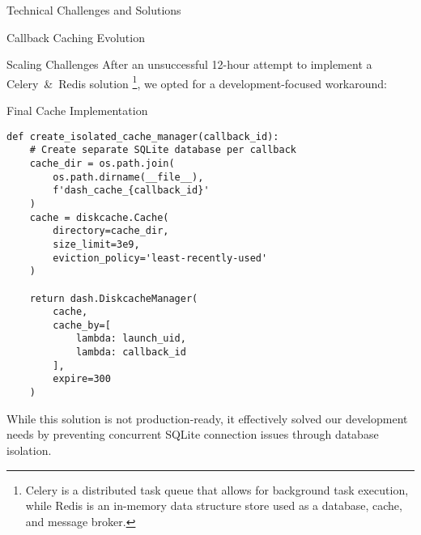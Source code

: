 \begin{section}{Technical Challenges and Solutions}
\begin{subsection}{Callback Caching Evolution}
\begin{subsubsection}{Scaling Challenges}
			After an unsuccessful 12-hour attempt to implement a Celery\cite{celery_getting_started_introduction}~\&~Redis\cite{redis_latest} solution
			\footnote{
				Celery is a distributed task queue that allows for background task execution, while Redis is an in-memory data structure store used as a database, cache, and message broker\cite{reintech_blog_combining_celery_redis_caching_task_queuing}.
			},
			we opted for a development-focused workaround:

			\begin{listing}[H]
				\caption{Final Cache Implementation}
				\begin{verbatim}
def create_isolated_cache_manager(callback_id):
    # Create separate SQLite database per callback
    cache_dir = os.path.join(
        os.path.dirname(__file__),
        f'dash_cache_{callback_id}'
    )
    cache = diskcache.Cache(
        directory=cache_dir,
        size_limit=3e9,
        eviction_policy='least-recently-used'
    )

    return dash.DiskcacheManager(
        cache,
        cache_by=[
            lambda: launch_uid,
            lambda: callback_id
        ],
        expire=300
    )
				\end{verbatim}
				\label{lst:dashboard-implementation-cache-final}
			\end{listing}

			While this solution is not production-ready, it effectively solved our development needs by preventing concurrent SQLite connection issues through database isolation.
		\end{subsubsection}

	\end{subsection}
\end{section}

